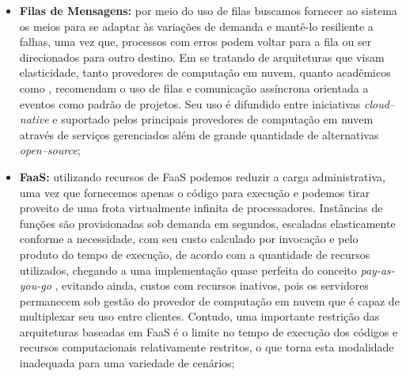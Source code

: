 \documentclass[english,brazilian]{UNISINOSmonografia} %
\begin{document}
\begin{itemize}
	\begin{itemize}
		
		\item \textbf{Filas de Mensagens:}
por meio do uso de filas buscamos fornecer ao sistema os meios para se adaptar às variações de demanda e mantê-lo resiliente a falhas, uma vez que, processos com erros podem voltar para a fila ou ser direcionados para outro destino. Em se tratando de arquiteturas que visam elasticidade, tanto provedores de computação em nuvem, quanto acadêmicos como , recomendam o uso de filas e comunicação assíncrona orientada a eventos como padrão de projetos.
Seu uso é difundido entre iniciativas \textit{cloud--native} e suportado pelos principais provedores de computação em nuvem através de serviços gerenciados além de grande quantidade de alternativas \textit{open--source};
		
		\item \textbf{FaaS:}
utilizando recursos de FaaS podemos reduzir a carga administrativa, uma vez que fornecemos apenas o código para execução e podemos tirar proveito de uma frota virtualmente infinita de processadores.
Instâncias de funções são provisionadas sob demanda em segundos, escaladas elasticamente conforme a necessidade, com seu custo calculado por invocação e pelo produto do tempo de execução, de acordo com a quantidade de recursos utilizados, chegando a uma implementação quase perfeita do conceito \textit{pay-as-you-go} \cite{Spillner}, evitando ainda, custos com recursos inativos, pois os servidores permanecem sob gestão do provedor de computação em nuvem que é capaz de multiplexar seu uso entre clientes. 
Contudo, uma importante restrição das arquiteturas baseadas em FaaS é o limite no tempo de execução dos códigos e recursos computacionais relativamente restritos, o que torna esta modalidade inadequada para uma variedade de cenários;


\end{itemize}
\end{itemize}
\end{document}
